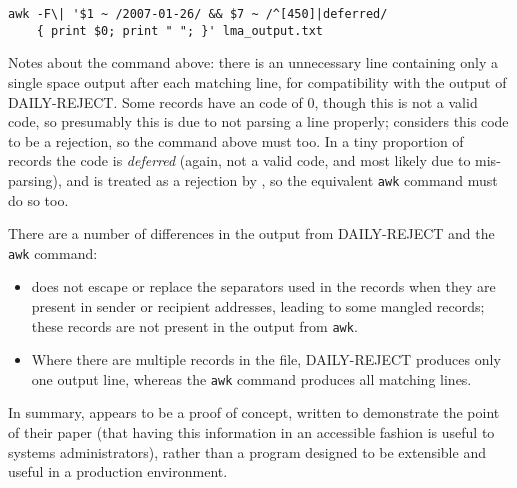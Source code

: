 \documentclass[a4paper,12pt,draft]{article}
\begin{document}
\begin{verbatim}
awk -F\| '$1 ~ /2007-01-26/ && $7 ~ /^[450]|deferred/
    { print $0; print " "; }' lma_output.txt
\end{verbatim}

Notes about the command above: there is an unnecessary line containing only
a single space output after each matching line, for compatibility with the
output of DAILY-REJECT\@.  Some records have an \SMTP{} code of 0, though
this is not a valid \SMTP{} code, so presumably this is due to \LMA{} not
parsing a line properly; \LMA{} considers this code to be a rejection, so
the command above must too.  In a tiny proportion of records the \SMTP{}
code is \textit{deferred\/} (again, not a valid code, and most likely due
to mis-parsing), and is treated as a rejection by \LMA{}, so the equivalent
\texttt{awk} command must do so too.

There are a number of differences in the output from DAILY-REJECT and the
\texttt{awk} command:

\begin{itemize}

    \item \LMA{} does not escape or replace the separators used in the
        \CSV{} records when they are present in sender or recipient
        addresses, leading to some mangled records; these records are not
        present in the output from \texttt{awk}.

    \item Where there are multiple records in the \CSV{} file, DAILY-REJECT
        produces only one output line, whereas the \texttt{awk} command
        produces all matching lines.

\end{itemize}

In summary, \LMA{} appears to be a proof of concept, written to demonstrate
the point of their paper (that having this information in an accessible
fashion is useful to systems administrators), rather than a program
designed to be extensible and useful in a production environment.
\end{document}
